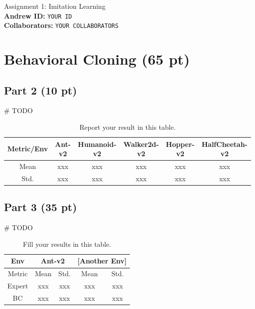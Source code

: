 \documentclass{article}
\begin{document}

\begin{centering}
    {\Large Assignment 1: Imitation Learning} \\
    \vspace{.25cm}
    \textbf{Andrew ID:} \texttt{YOUR ID} \\
    \textbf{Collaborators:} \texttt{YOUR COLLABORATORS}\\ 
\end{centering}

\vspace{.5cm}

\section{Behavioral Cloning (65 pt)}
\subsection{Part 2 (10 pt)}
\# TODO
\begin{table}[!h]
  \centering
  \caption{Report your result in this table.}
    \begin{tabular}{cccccc}
    \toprule[1.0pt]
    Metric/Env & Ant-v2 & Humanoid-v2 & Walker2d-v2 & Hopper-v2 & HalfCheetah-v2 \\
    \midrule
    Mean  & xxx & xxx & xxx & xxx & xxx \\
    Std.  & xxx & xxx & xxx  & xxx  & xxx \\
    \bottomrule[1.0pt]
    \end{tabular}%
  \label{tab:p2}%
\end{table}%

\subsection{Part 3 (35 pt)}
\# TODO
\begin{table}[htbp]
  \centering
  \caption{Fill your results in this table.}
    \begin{tabular}{ccccc}
    \toprule[1.0pt]
    Env   & \multicolumn{2}{c}{Ant-v2} & \multicolumn{2}{c}{[Another Env]} \\
    \midrule
    Metric & Mean  & Std.  & Mean  & Std. \\
    Expert & xxx & xxx & xxx & xxx \\
    BC    & xxx & xxx & xxx & xxx \\
    \bottomrule[1.0pt]
    \end{tabular}%
  \label{tab:p3}%
\end{table}%
\end{document}
